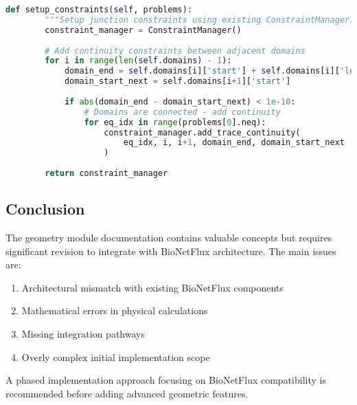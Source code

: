 \begin{lstlisting}[language=Python, caption=Corrected Network Integration]
    def setup_constraints(self, problems):
        """Setup junction constraints using existing ConstraintManager."""
        constraint_manager = ConstraintManager()
        
        # Add continuity constraints between adjacent domains
        for i in range(len(self.domains) - 1):
            domain_end = self.domains[i]['start'] + self.domains[i]['length']
            domain_start_next = self.domains[i+1]['start']
            
            if abs(domain_end - domain_start_next) < 1e-10:
                # Domains are connected - add continuity
                for eq_idx in range(problems[0].neq):
                    constraint_manager.add_trace_continuity(
                        eq_idx, i, i+1, domain_end, domain_start_next
                    )
        
        return constraint_manager
\end{lstlisting}

\subsection{Conclusion}

The geometry module documentation contains valuable concepts but requires significant revision to integrate with BioNetFlux architecture. The main issues are:

\begin{enumerate}
    \item Architectural mismatch with existing BioNetFlux components
    \item Mathematical errors in physical calculations
    \item Missing integration pathways
    \item Overly complex initial implementation scope
\end{enumerate}

A phased implementation approach focusing on BioNetFlux compatibility is recommended before adding advanced geometric features.

